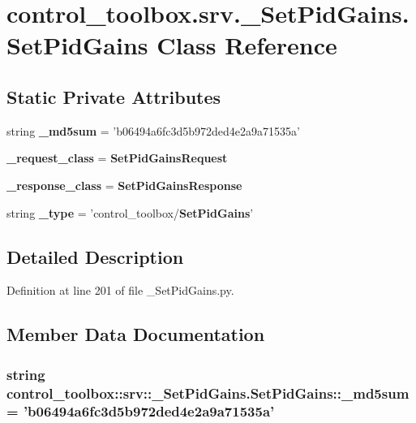 \section{control\-\_\-toolbox.\-srv.\-\_\-\-Set\-Pid\-Gains.\-Set\-Pid\-Gains \-Class \-Reference}
\label{classcontrol__toolbox_1_1srv_1_1__SetPidGains_1_1SetPidGains}
\subsection*{\-Static \-Private \-Attributes}
\begin{DoxyCompactItemize}
\item 
string {\bf \-\_\-md5sum} = 'b06494a6fc3d5b972ded4e2a9a71535a'
\item 
{\bf \-\_\-request\-\_\-class} = {\bf \-Set\-Pid\-Gains\-Request}
\item 
{\bf \-\_\-response\-\_\-class} = {\bf \-Set\-Pid\-Gains\-Response}
\item 
string {\bf \-\_\-type} = 'control\-\_\-toolbox/{\bf \-Set\-Pid\-Gains}'
\end{DoxyCompactItemize}


\subsection{\-Detailed \-Description}


\-Definition at line 201 of file \-\_\-\-Set\-Pid\-Gains.\-py.



\subsection{\-Member \-Data \-Documentation}
\subsubsection[{\-\_\-md5sum}]{\setlength{\rightskip}{0pt plus 5cm}string {\bf control\-\_\-toolbox\-::srv\-::\-\_\-\-Set\-Pid\-Gains.\-Set\-Pid\-Gains\-::\-\_\-md5sum} = 'b06494a6fc3d5b972ded4e2a9a71535a'\hspace{0.3cm}{\ttfamily  [static, private]}}\label{classcontrol__toolbox_1_1srv_1_1__SetPidGains_1_1SetPidGains_a5510c7553d3e02f5be44ca519029a829}


